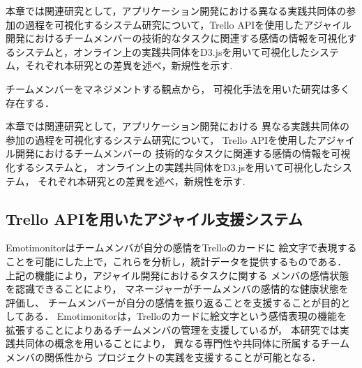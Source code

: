 

本章では関連研究として，アプリケーション開発における異なる実践共同体の参加の過程を可視化するシステム研究について，Trello APIを使用したアジャイル開発におけるチームメンバーの技術的なタスクに関連する感情の情報を可視化するシステムと，オンライン上の実践共同体をD3.jsを用いて可視化したシステム，それぞれ本研究との差異を述べ，新規性を示す.

チームメンバーをマネジメントする観点から，
可視化手法を用いた研究は多く存在する．

本章では関連研究として，アプリケーション開発における
異なる実践共同体の参加の過程を可視化するシステム研究について，
Trello APIを使用したアジャイル開発におけるチームメンバーの
技術的なタスクに関連する感情の情報を可視化するシステムと，
オンライン上の実践共同体をD3.jsを用いて可視化したシステム，
それぞれ本研究との差異を述べ，新規性を示す.

\subsection{Trello APIを用いたアジャイル支援システム}
Emotimonitorはチームメンバが自分の感情をTrelloのカードに
絵文字で表現することを可能にした上で，これらを分析し，統計データを提供するものである．
上記の機能により，アジャイル開発におけるタスクに関する
メンバの感情状態を認識できることにより，
マネージャーがチームメンバの感情的な健康状態を評価し、
チームメンバーが自分の感情を振り返ることを支援することが目的としてある．
Emotimonitorは，Trelloのカードに絵文字という感情表現の機能を
拡張することによりあるチームメンバの管理を支援しているが，
本研究では実践共同体の概念を用いることにより，
異なる専門性や共同体に所属するチームメンバの関係性から
プロジェクトの実践を支援することが可能となる．　　　